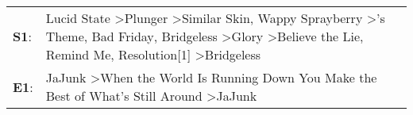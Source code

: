 \begin{supertabular}{p{0.03\textwidth}p{0.92\textwidth}}
 \textbf{S1}:  &  Lucid State\textsuperscript{} \textgreater \enspace Plunger\textsuperscript{} \textgreater \enspace Similar Skin\textsuperscript{}, \enspace Wappy Sprayberry\textsuperscript{} \textgreater {}'s Theme\textsuperscript{}, \enspace Bad Friday\textsuperscript{}, \enspace Bridgeless\textsuperscript{} \textgreater \enspace Glory\textsuperscript{} \textgreater \enspace Believe the Lie\textsuperscript{}, \enspace Remind Me\textsuperscript{}, \enspace Resolution[1]\textsuperscript{} \textgreater \enspace Bridgeless\textsuperscript{}  \enspace  \\
 \textbf{E1}:  &                                                                                                                                                                                                                                                                                                                                                                    JaJunk\textsuperscript{} \textgreater \enspace When the World Is Running Down You Make the Best of What's Still Around\textsuperscript{} \textgreater \enspace JaJunk\textsuperscript{}  \enspace  \\
\end{supertabular}
